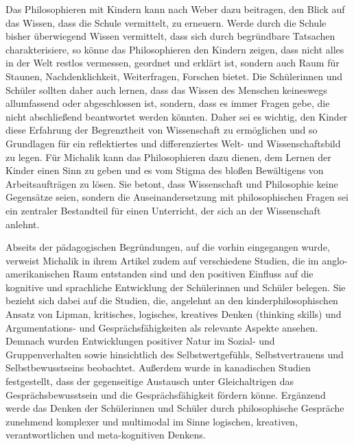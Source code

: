 Das Philosophieren mit Kindern kann nach Weber dazu beitragen, den Blick auf das Wissen, dass die Schule vermittelt, zu erneuern.
Werde durch die Schule bisher überwiegend Wissen vermittelt, dass sich durch begründbare Tatsachen charakterisiere, so könne das Philosophieren den Kindern zeigen, dass nicht alles in der Welt \glqq restlos vermessen, geordnet und erklärt ist, sondern auch Raum für Staunen, Nachdenklichkeit, Weiterfragen, Forschen bietet.\grqq{} \cite[S.\,639]{KM13}
Die Schülerinnen und Schüler sollten daher auch lernen, dass das Wissen des Menschen keineswegs allumfassend oder abgeschlossen ist, sondern, dass es immer Fragen gebe, die nicht abschließend beantwortet werden könnten.
Daher sei es wichtig, den Kinder diese Erfahrung der Begrenztheit von Wissenschaft zu ermöglichen und so \glqq Grundlagen für ein reflektiertes und differenziertes Welt- und Wissenschaftsbild zu legen.\grqq{} \cite[S.\,640]{KM13}
Für Michalik kann das Philosophieren dazu dienen, dem Lernen der Kinder einen Sinn zu geben und es vom Stigma des bloßen Bewältigens von Arbeitsaufträgen zu lösen.
Sie betont, dass Wissenschaft und Philosophie keine Gegensätze seien, sondern die Auseinandersetzung mit philosophischen Fragen sei ein zentraler Bestandteil für einen Unterricht, der sich an der Wissenschaft anlehnt.
  
Abseits der pädagogischen Begründungen, auf die vorhin eingegangen wurde, verweist Michalik in ihrem Artikel zudem auf verschiedene Studien, die im anglo-amerikanischen Raum entstanden sind und den positiven Einfluss auf die kognitive und sprachliche Entwicklung der Schülerinnen und Schüler belegen. 
Sie bezieht sich dabei auf die Studien, die, angelehnt an den kinderphilosophischen Ansatz von Lipman, \glqq kritisches, logisches, kreatives Denken (thinking skills) und Argumentations- und Gesprächsfähigkeiten\grqq{} \cite[S.\,643]{KM13} als relevante Aspekte ansehen. 
Demnach wurden Entwicklungen positiver Natur im Sozial- und Gruppenverhalten sowie hinsichtlich des Selbstwertgefühls, Selbstvertrauens und Selbstbewusstseins beobachtet.
Außerdem wurde in kanadischen Studien festgestellt, dass der gegenseitige Austausch unter Gleichaltrigen das Gesprächsbewusstsein und die Gesprächsfähigkeit fördern könne. 
Ergänzend werde das Denken der Schülerinnen und Schüler durch philosophische Gespräche \glqq zunehmend komplexer und multimodal im Sinne logischen, kreativen, verantwortlichen und meta-kognitiven Denkens.\grqq{} \cite[S.\,643]{KM13}


